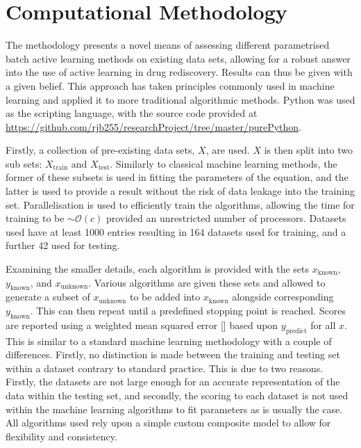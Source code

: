 
\section{Computational Methodology}
The methodology presents a novel means of assessing different parametrised batch active learning methods on existing data sets, allowing for a robust answer into the use of active learning in drug rediscovery. Results can thus be given with a given belief. This approach has taken principles commonly used in machine learning and applied it to more traditional algorithmic methods. Python was used as the scripting language, with the source code provided at \url{https://github.com/rjb255/researchProject/tree/master/purePython}.

Firstly, a collection of pre-existing data sets, $X$, are used. $X$ is then split into two sub sets: $X_{\mathrm{train}}$ and $X_\mathrm{test}$. Similarly to classical machine learning methods, the former of these subsets is used in fitting the parameters of the equation, and the latter is used to provide a result without the risk of data leakage into the training set. Parallelisation is used to efficiently train the algorithms, allowing the time for training to be $\sim{}\mathcal{O}(c)$ provided an unrestricted number of processors. Datasets used have at least 1000 entries resulting in 164 datasets used for training, and a further 42 used for testing.

Examining the smaller details, each algorithm is provided with the sets $x_\mathrm{known}$, $y_\mathrm{known}$, and $x_\mathrm{unknown}$. Various algorithms are given these sets and allowed to generate a subset of $x_\mathrm{unknown}$ to be added into $x_\mathrm{known}$ alongside corresponding $y_\mathrm{known}$. This can then repeat until a predefined stopping point is reached. Scores are reported using a weighted mean squared error [] based upon $y_\mathrm{predict}$ for all $x$. This is similar to a standard machine learning methodology with a couple of differences. Firstly, no distinction is made between the training and testing set within a dataset contrary to standard practice. This is due to two reasons. Firstly, the datasets are not large enough for an accurate representation of the data within the testing set, and secondly, the scoring to each dataset is not used within the machine learning algorithms to fit parameters as is usually the case. All algorithms used rely upon a simple custom composite model to allow for flexibility and consistency.


